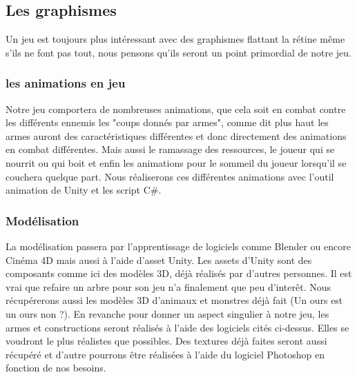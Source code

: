 \documentclass{article}
\begin{document}
\par 

\newline



\newpage
\subsection{Les graphismes}

\par
Un jeu est toujours plus intéressant avec des graphismes flattant la rétine même s'ils ne font pas tout, nous pensons qu'ils seront un point primordial de notre jeu.
\newline

\subsubsection{les animations en jeu}
\par 
Notre jeu comportera de nombreuses animations, que cela soit en combat contre les différents ennemis les "coups donnés par armes", comme dit plus haut les armes auront des caractéristiques différentes et donc directement des animations en combat différentes. Mais aussi le ramassage des ressources, le joueur qui se nourrit ou qui boit et enfin les animations pour le sommeil du joueur lorsqu'il se couchera quelque part. Nous réaliserons ces différentes animations avec l'outil animation de Unity et les script C\#. 
\newline



\subsubsection{Modélisation }

\par 
La modélisation passera par l'apprentissage de logiciels comme Blender ou encore Cinéma 4D mais aussi à l'aide d'asset Unity. Les assets d'Unity sont des composants comme ici des modèles 3D, déjà réalisés par d'autres personnes. Il est vrai que refaire un arbre pour son jeu n'a finalement que peu d'interêt. Nous récupérerons aussi les modèles 3D d'animaux et monstres déjà fait (Un ours est un ours non ?). En revanche pour donner un aspect singulier à notre jeu, les armes et constructions seront réalisés à l'aide des logiciels cités ci-dessus. Elles se voudront le plus réalistes que possibles. Des textures déjà faites seront aussi récupéré et d'autre pourrons être réalisées à l'aide du logiciel Photoshop en fonction de nos besoins.
\newline
\end{document}
